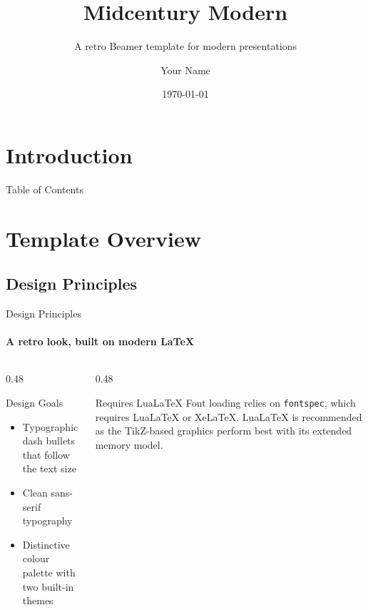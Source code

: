 \documentclass[aspectratio=169]{beamer}
\title{Midcentury Modern}
\subtitle{A retro Beamer template for modern presentations}
\author{Your Name}
\institute{ENAC}
\date{\today}
\begin{document}
\section*{Introduction}

\begin{frame}
  \titlepage
\end{frame}

\begin{frame}{Table of Contents}
  \tableofcontents
\end{frame}

\section{Template Overview}

\subsection{Design Principles}

\begin{frame}{Design Principles}
  \framesubtitle{A retro look, built on modern LaTeX}
  \begin{columns}[T]
    \begin{column}{0.48\textwidth}
      \begin{block}{Design Goals}
        \begin{itemize}
          \item Typographic dash bullets that follow the text size
          \item Clean sans-serif typography
          \item Distinctive colour palette with two built-in themes
        \end{itemize}
      \end{block}
    \end{column}
    \begin{column}{0.48\textwidth}
      \begin{alertblock}{Requires LuaLaTeX}
        Font loading relies on \texttt{fontspec}, which requires
        LuaLaTeX or XeLaTeX. LuaLaTeX is recommended as the
        TikZ-based graphics perform best with its extended memory
        model.
      \end{alertblock}
    \end{column}
  \end{columns}
\end{frame}
\end{document}
